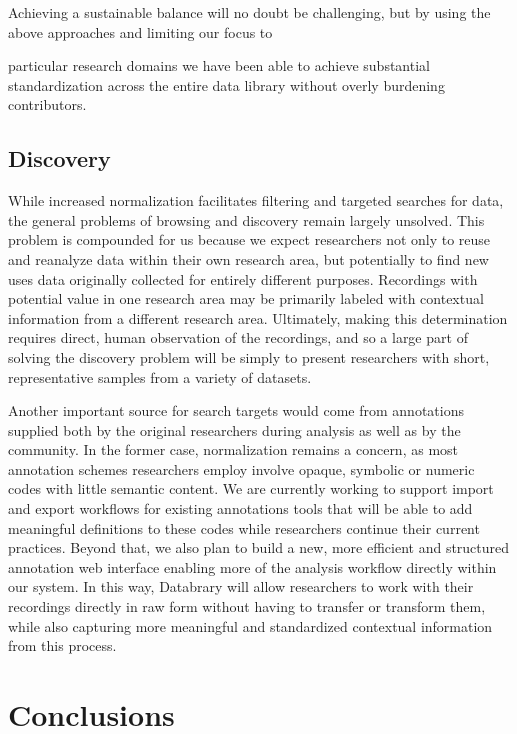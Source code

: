 \documentclass{sig-alternate}
\begin{document}
Achieving a sustainable balance will no doubt be challenging, but by using the above approaches and limiting our focus to 

particular research domains we have been able to achieve substantial standardization across the entire data library without overly burdening contributors.

\subsection{Discovery}

While increased normalization facilitates filtering and targeted searches for data, the general problems of browsing and discovery remain largely unsolved.
This problem is compounded for us because we expect researchers not only to reuse and reanalyze data within their own research area, but potentially to find new uses data originally collected for entirely different purposes.
Recordings with potential value in one research area may be primarily labeled with contextual information from a different research area.
Ultimately, making this determination requires direct, human observation of the recordings, and so a large part of solving the discovery problem will be simply to present researchers with short, representative samples from a variety of datasets.

Another important source for search targets would come from annotations supplied both by the original researchers during analysis as well as by the community.
In the former case, normalization remains a concern, as most annotation schemes researchers employ involve opaque, symbolic or numeric codes with little semantic content.
We are currently working to support import and export workflows for existing annotations tools that will be able to add meaningful definitions to these codes while researchers continue their current practices.
Beyond that, we also plan to build a new, more efficient and structured annotation web interface enabling more of the analysis workflow directly within our system.
In this way, Databrary will allow researchers to work with their recordings directly in raw form without having to transfer or transform them, while also capturing more meaningful and standardized contextual information from this process.

\section{Conclusions}
\end{document}
